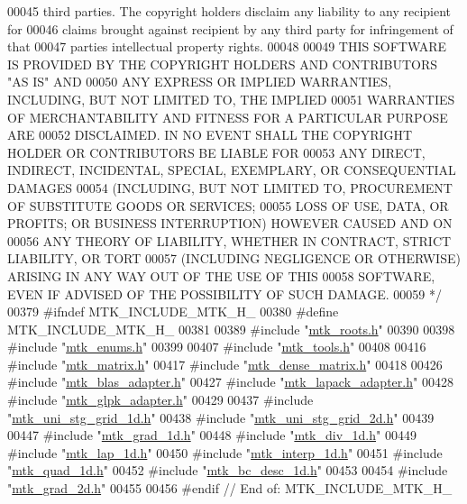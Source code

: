 \begin{DoxyCode}
00045 \textcolor{comment}{third parties. The copyright holders disclaim any liability to any recipient for}
00046 \textcolor{comment}{claims brought against recipient by any third party for infringement of that}
00047 \textcolor{comment}{parties intellectual property rights.}
00048 \textcolor{comment}{}
00049 \textcolor{comment}{THIS SOFTWARE IS PROVIDED BY THE COPYRIGHT HOLDERS AND CONTRIBUTORS "AS IS" AND}
00050 \textcolor{comment}{ANY EXPRESS OR IMPLIED WARRANTIES, INCLUDING, BUT NOT LIMITED TO, THE IMPLIED}
00051 \textcolor{comment}{WARRANTIES OF MERCHANTABILITY AND FITNESS FOR A PARTICULAR PURPOSE ARE}
00052 \textcolor{comment}{DISCLAIMED. IN NO EVENT SHALL THE COPYRIGHT HOLDER OR CONTRIBUTORS BE LIABLE FOR}
00053 \textcolor{comment}{ANY DIRECT, INDIRECT, INCIDENTAL, SPECIAL, EXEMPLARY, OR CONSEQUENTIAL DAMAGES}
00054 \textcolor{comment}{(INCLUDING, BUT NOT LIMITED TO, PROCUREMENT OF SUBSTITUTE GOODS OR SERVICES;}
00055 \textcolor{comment}{LOSS OF USE, DATA, OR PROFITS; OR BUSINESS INTERRUPTION) HOWEVER CAUSED AND ON}
00056 \textcolor{comment}{ANY THEORY OF LIABILITY, WHETHER IN CONTRACT, STRICT LIABILITY, OR TORT}
00057 \textcolor{comment}{(INCLUDING NEGLIGENCE OR OTHERWISE) ARISING IN ANY WAY OUT OF THE USE OF THIS}
00058 \textcolor{comment}{SOFTWARE, EVEN IF ADVISED OF THE POSSIBILITY OF SUCH DAMAGE.}
00059 \textcolor{comment}{*/}
00379 \textcolor{preprocessor}{#ifndef MTK\_INCLUDE\_MTK\_H\_}
00380 \textcolor{preprocessor}{#define MTK\_INCLUDE\_MTK\_H\_}
00381 
00389 \textcolor{preprocessor}{#include "\hyperlink{mtk__roots_8h}{mtk\_roots.h}"}
00390 
00398 \textcolor{preprocessor}{#include "\hyperlink{mtk__enums_8h}{mtk\_enums.h}"}
00399 
00407 \textcolor{preprocessor}{#include "\hyperlink{mtk__tools_8h}{mtk\_tools.h}"}
00408 
00416 \textcolor{preprocessor}{#include "\hyperlink{mtk__matrix_8h}{mtk\_matrix.h}"}
00417 \textcolor{preprocessor}{#include "\hyperlink{mtk__dense__matrix_8h}{mtk\_dense\_matrix.h}"}
00418 
00426 \textcolor{preprocessor}{#include "\hyperlink{mtk__blas__adapter_8h}{mtk\_blas\_adapter.h}"}
00427 \textcolor{preprocessor}{#include "\hyperlink{mtk__lapack__adapter_8h}{mtk\_lapack\_adapter.h}"}
00428 \textcolor{preprocessor}{#include "\hyperlink{mtk__glpk__adapter_8h}{mtk\_glpk\_adapter.h}"}
00429 
00437 \textcolor{preprocessor}{#include "\hyperlink{mtk__uni__stg__grid__1d_8h}{mtk\_uni\_stg\_grid\_1d.h}"}
00438 \textcolor{preprocessor}{#include "\hyperlink{mtk__uni__stg__grid__2d_8h}{mtk\_uni\_stg\_grid\_2d.h}"}
00439 
00447 \textcolor{preprocessor}{#include "\hyperlink{mtk__grad__1d_8h}{mtk\_grad\_1d.h}"}
00448 \textcolor{preprocessor}{#include "\hyperlink{mtk__div__1d_8h}{mtk\_div\_1d.h}"}
00449 \textcolor{preprocessor}{#include "\hyperlink{mtk__lap__1d_8h}{mtk\_lap\_1d.h}"}
00450 \textcolor{preprocessor}{#include "\hyperlink{mtk__interp__1d_8h}{mtk\_interp\_1d.h}"}
00451 \textcolor{preprocessor}{#include "\hyperlink{mtk__quad__1d_8h}{mtk\_quad\_1d.h}"}
00452 \textcolor{preprocessor}{#include "\hyperlink{mtk__bc__desc__1d_8h}{mtk\_bc\_desc\_1d.h}"}
00453 
00454 \textcolor{preprocessor}{#include "\hyperlink{mtk__grad__2d_8h}{mtk\_grad\_2d.h}"}
00455 
00456 \textcolor{preprocessor}{#endif // End of: MTK\_INCLUDE\_MTK\_H\_}
\end{DoxyCode}
